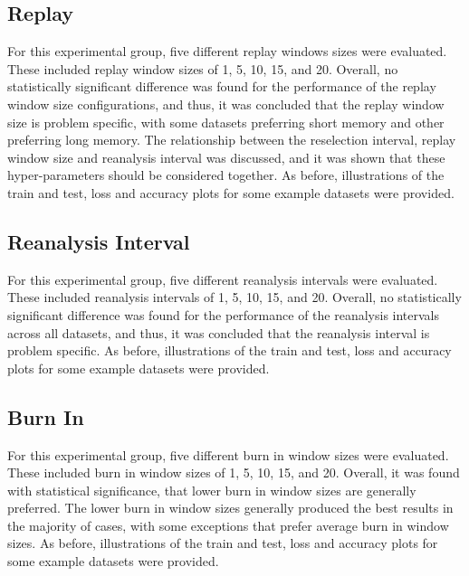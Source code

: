 \subsection{Replay}
\label{sec:conclusion:results:summary:replay}

For this experimental group, five different replay windows sizes were evaluated. These included replay window sizes of 1, 5, 10, 15, and 20. Overall, no statistically significant difference was found for the performance of the replay window size configurations, and thus, it was concluded that the replay window size is problem specific, with some datasets preferring short memory and other preferring long memory. The relationship between the reselection interval, replay window size and reanalysis interval was discussed, and it was shown that these hyper-parameters should be considered together. As before, illustrations of the train and test, loss and accuracy plots for some example datasets were provided.


\subsection{Reanalysis Interval}
\label{sec:conclusion:results:summary:reanalysis}

For this experimental group, five different reanalysis intervals were evaluated. These included reanalysis intervals of 1, 5, 10, 15, and 20. Overall, no statistically significant difference was found for the performance of the reanalysis intervals across all datasets, and thus, it was concluded that the reanalysis interval is problem specific. As before, illustrations of the train and test, loss and accuracy plots for some example datasets were provided.

\subsection{Burn In}
\label{sec:conclusion:results:summary:burn_in}

For this experimental group, five different burn in window sizes were evaluated. These included burn in window sizes of 1, 5, 10, 15, and 20. Overall, it was found with statistical significance, that lower burn in window sizes are generally preferred. The lower burn in window sizes generally produced the best results in the majority of cases, with some exceptions that prefer average burn in window sizes. As before, illustrations of the train and test, loss and accuracy plots for some example datasets were provided.

